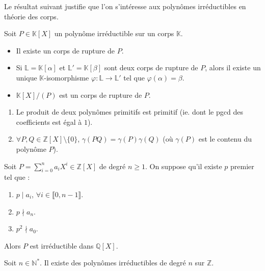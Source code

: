 	Le résultat suivant justifie que l'on s'intéresse aux polynômes irréductibles en théorie des corps.


	\begin{theorem}
		Soit $P \in \mathbb{K}[X]$ un polynôme irréductible sur un corps $\mathbb{K}$.
		\begin{itemize}
			\item Il existe un corps de rupture de $P$.
			\item Si $\mathbb{L} = \mathbb{K}[\alpha]$ et $\mathbb{L}' = \mathbb{K}[\beta]$ sont deux corps de rupture de $P$, alors il existe un unique $\mathbb{K}$-isomorphisme $\varphi : \mathbb{L} \rightarrow \mathbb{L}'$ tel que $\varphi(\alpha) = \beta$.
			\item $\mathbb{K}[X]/(P)$ est un corps de rupture de $P$.
		\end{itemize}
	\end{theorem}


	\begin{lemma}[Gauss]
		\begin{enumerate}[label=(\roman*)]
			\item Le produit de deux polynômes primitifs est primitif (ie. dont le pgcd des coefficients est égal à $1$).
			\item $\forall P, Q \in \mathbb{Z}[X] \setminus \{ 0 \}$, $\gamma(PQ) = \gamma(P) \gamma(Q)$ (où $\gamma(P)$ est le contenu du polynôme $P$).
		\end{enumerate}
	\end{lemma}


	\begin{theorem}
		Soit $P = \sum_{i=0}^n a_i X^i \in \mathbb{Z}[X]$ de degré $n \geq 1$. On suppose qu'il existe $p$ premier tel que :
		\begin{enumerate}[label=(\roman*)]
			\item $p \mid a_i$, $\forall i \in \llbracket 0, n-1 \rrbracket$.
			\item $p \nmid a_n$.
			\item $p^2 \nmid a_0$.
		\end{enumerate}
		Alors $P$ est irréductible dans $\mathbb{Q}[X]$.
	\end{theorem}


	\begin{application}
		Soit $n \in \mathbb{N}^*$. Il existe des polynômes irréductibles de degré $n$ sur $\mathbb{Z}$.
	\end{application}

